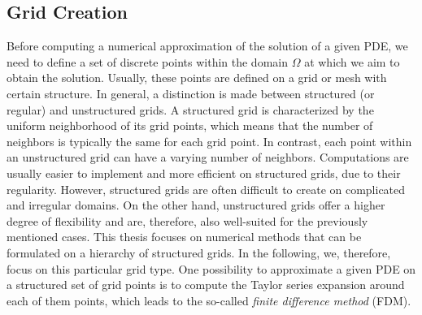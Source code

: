 \subsection{Grid Creation}
Before computing a numerical approximation of the solution of a given PDE, we need to define a set of discrete points within the domain $\Omega$ at which we aim to obtain the solution.
Usually, these points are defined on a grid or mesh with certain structure.
In general, a distinction is made between structured (or regular) and unstructured grids.
A structured grid is characterized by the uniform neighborhood of its grid points, which means that the number of neighbors is typically the same for each grid point.
In contrast, each point within an unstructured grid can have a varying number of neighbors.
Computations are usually easier to implement and more efficient on structured grids, due to their regularity.
However, structured grids are often difficult to create on complicated and irregular domains.
On the other hand, unstructured grids offer a higher degree of flexibility and are, therefore, also well-suited for the previously mentioned cases. %
This thesis focuses on numerical methods that can be formulated on a hierarchy of structured grids. 
In the following, we, therefore, focus on this particular grid type.
One possibility to approximate a given PDE on a structured set of grid points is to compute the Taylor series expansion around each of them points, which leads to the so-called \emph{finite difference method} (FDM).
